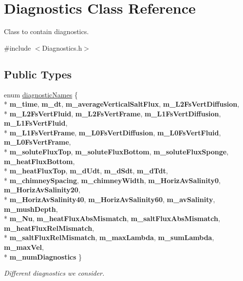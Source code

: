 \hypertarget{class_diagnostics}{\section{Diagnostics Class Reference}
\label{class_diagnostics}
}


Class to contain diagnostics.  




{\ttfamily \#include $<$Diagnostics.\-h$>$}

\subsection*{Public Types}
\begin{DoxyCompactItemize}
\item 
enum \hyperlink{class_diagnostics_a773b8651afdbc8f9d6106c01a093814f}{diagnostic\-Names} \{ \\*
{\bfseries m\-\_\-time}, 
{\bfseries m\-\_\-dt}, 
{\bfseries m\-\_\-average\-Vertical\-Salt\-Flux}, 
{\bfseries m\-\_\-\-L2\-Fs\-Vert\-Diffusion}, 
\\*
{\bfseries m\-\_\-\-L2\-Fs\-Vert\-Fluid}, 
{\bfseries m\-\_\-\-L2\-Fs\-Vert\-Frame}, 
{\bfseries m\-\_\-\-L1\-Fs\-Vert\-Diffusion}, 
{\bfseries m\-\_\-\-L1\-Fs\-Vert\-Fluid}, 
\\*
{\bfseries m\-\_\-\-L1\-Fs\-Vert\-Frame}, 
{\bfseries m\-\_\-\-L0\-Fs\-Vert\-Diffusion}, 
{\bfseries m\-\_\-\-L0\-Fs\-Vert\-Fluid}, 
{\bfseries m\-\_\-\-L0\-Fs\-Vert\-Frame}, 
\\*
{\bfseries m\-\_\-solute\-Flux\-Top}, 
{\bfseries m\-\_\-solute\-Flux\-Bottom}, 
{\bfseries m\-\_\-solute\-Flux\-Sponge}, 
{\bfseries m\-\_\-heat\-Flux\-Bottom}, 
\\*
{\bfseries m\-\_\-heat\-Flux\-Top}, 
{\bfseries m\-\_\-d\-Udt}, 
{\bfseries m\-\_\-d\-Sdt}, 
{\bfseries m\-\_\-d\-Tdt}, 
\\*
{\bfseries m\-\_\-chimney\-Spacing}, 
{\bfseries m\-\_\-chimney\-Width}, 
{\bfseries m\-\_\-\-Horiz\-Av\-Salinity0}, 
{\bfseries m\-\_\-\-Horiz\-Av\-Salinity20}, 
\\*
{\bfseries m\-\_\-\-Horiz\-Av\-Salinity40}, 
{\bfseries m\-\_\-\-Horiz\-Av\-Salinity60}, 
{\bfseries m\-\_\-av\-Salinity}, 
{\bfseries m\-\_\-mush\-Depth}, 
\\*
{\bfseries m\-\_\-\-Nu}, 
{\bfseries m\-\_\-heat\-Flux\-Abs\-Mismatch}, 
{\bfseries m\-\_\-salt\-Flux\-Abs\-Mismatch}, 
{\bfseries m\-\_\-heat\-Flux\-Rel\-Mismatch}, 
\\*
{\bfseries m\-\_\-salt\-Flux\-Rel\-Mismatch}, 
{\bfseries m\-\_\-max\-Lambda}, 
{\bfseries m\-\_\-sum\-Lambda}, 
{\bfseries m\-\_\-max\-Vel}, 
\\*
{\bfseries m\-\_\-num\-Diagnostics}
 \}
\begin{DoxyCompactList}\small\item\em Different diagnostics we consider. \end{DoxyCompactList}\end{DoxyCompactItemize}
